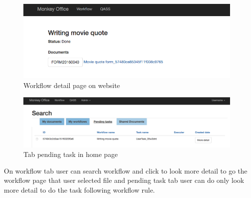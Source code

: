 \begin{figure}[h!]

	\centering
	\includegraphics[scale=0.3]{res/wf_detail_page}
	\caption{Workflow detail page on website}
	\label{fig:screenshot_wfdetail}
\end{figure}

\begin{figure}[h!]

	\centering
	\includegraphics[scale=0.3]{res/pending_page}
	\caption{Tab pending task in home page}
	\label{fig:screenshot_pending}
\end{figure}

 On workflow tab user can search workflow and click to look more detail to go the workflow page that user selected file and pending task tab user can do only look more detail to do the task following workflow rule. 




